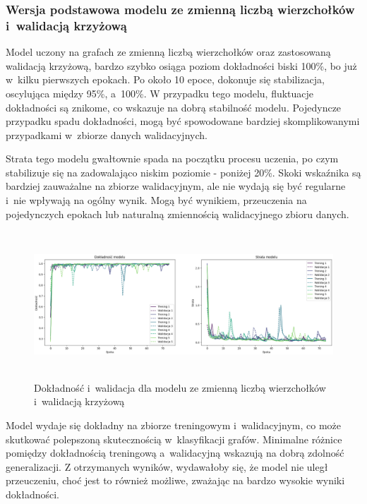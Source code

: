 \subsubsection{Wersja podstawowa modelu ze zmienną liczbą wierzchołków i~walidacją krzyżową}

Model uczony na grafach ze zmienną liczbą wierzchołków oraz zastosowaną walidacją krzyżową,
bardzo szybko osiąga poziom dokładności biski 100\%, bo już w~kilku pierwszych epokach.
Po około 10 epoce, dokonuje się stabilizacja, oscylująca między 95\%, a~100\%.
W przypadku tego modelu, fluktuacje dokładności są znikome, co wskazuje na dobrą stabilność modelu.
Pojedyncze przypadku spadu dokładności, mogą być spowodowane bardziej skomplikowanymi
przypadkami w~zbiorze danych walidacyjnych.

Strata tego modelu gwałtownie spada na początku procesu uczenia,
po czym stabilizuje się na zadowalająco niskim poziomie - poniżej 20\%.
Skoki wskaźnika są bardziej zauważalne na zbiorze walidacyjnym,
ale nie wydają się być regularne i~nie wpływają na ogólny wynik.
Mogą być wynikiem, przeuczenia na pojedynczych epokach lub naturalną zmiennością walidacyjnego zbioru danych.

\begin{figure}[ht]
	\centering
	\includegraphics[height=5.5cm]{resources/tests/images/v3/multiple_edges_crossvalid_img.png}
	\caption{Dokładność i~walidacja dla modelu ze zmienną liczbą wierzchołków i~walidacją krzyżową}
	\label{Fig:tests-csvar-0a}
\end{figure}
\FloatBarrier

Model wydaje się dokładny na zbiorze treningowym i~walidacyjnym,
co może skutkować polepszoną skutecznością w~klasyfikacji grafów.
Minimalne różnice pomiędzy dokładnością treningową a~walidacyjną wskazują na dobrą zdolność generalizacji.
Z otrzymanych wyników, wydawałoby się, że model nie uległ przeuczeniu,
choć jest to również możliwe, zważając na bardzo wysokie wyniki dokładności. 

